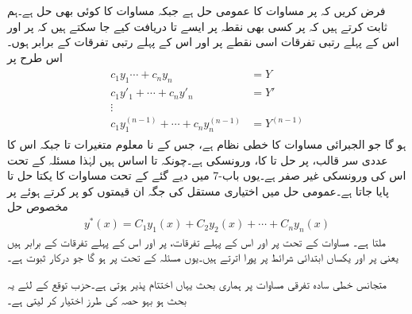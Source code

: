 
فرض کریں کہ  پر مساوات  کا عمومی حل  ہے جبکہ  مساوات  کا کوئی بھی حل ہے۔ہم ثابت کرتے ہیں کہ  پر کسی بھی نقطہ  پر ایسے  تا  دریافت کیے جا سکتے ہیں کہ  پر  اور اس کے پہلے  رتبی تفرقات اسی نقطے پر  اور اس کے پہلے  رتبی تفرقات کے برابر ہوں۔ اس طرح  پر 
\begin{gather}
\begin{aligned}\label{مساوات_سادہ_بلند_ورونسکی_سے_مستقل}
c_1y_1\cdots+c_ny_n&=Y\\
c_1y'_1+\cdots+c_ny'_n&=Y'\\
\vdots &\\
c_1y^{(n-1)}_1+\cdots+c_ny^{(n-1)}_n&=Y^{(n-1)}
\end{aligned}
\end{gather}
ہو گا جو الجبرائی مساوات کا خطی نظام ہے، جس کے نا معلوم متغیرات  تا  جبکہ اس کا عددی سر قالب،  پر حل  تا  کا،  ورونسکی ہے۔چونکہ  تا  اساس ہیں لہٰذا مسئلہ  کے تحت اس کی ورونسکی غیر صفر ہے۔یوں باب-7 میں دیے گئے  کے تحت مساوات  کا یکتا حل 
  تا   پایا جاتا ہے۔عمومی حل میں اختیاری مستقل کی جگہ ان قیمتوں کو پر کرتے ہوئے  پر مخصوص حل
\begin{align*}
y^*(x)=C_1y_1(x)+C_2y_2(x)+\cdots+C_ny_n(x)
\end{align*}
ملتا ہے۔ مساوات  کے تحت  پر  اور اس کے پہلے  تفرقات،  پر  اور اس کے پہلے  تفرقات کے برابر ہیں یعنی  پر  اور  یکساں ابتدائی شرائط پر پورا اترتے ہیں۔یوں مسئلہ  کے تحت  پر  ہو گا جو درکار ثبوت ہے۔

متجانس خطی سادہ تفرقی مساوات پر ہماری بحث یہاں اختتام پذیر ہوتی ہے۔حزب توقع  کے لئے یہ بحث ہو بہو حصہ  کی طرز اختیار کر لیتی ہے۔


